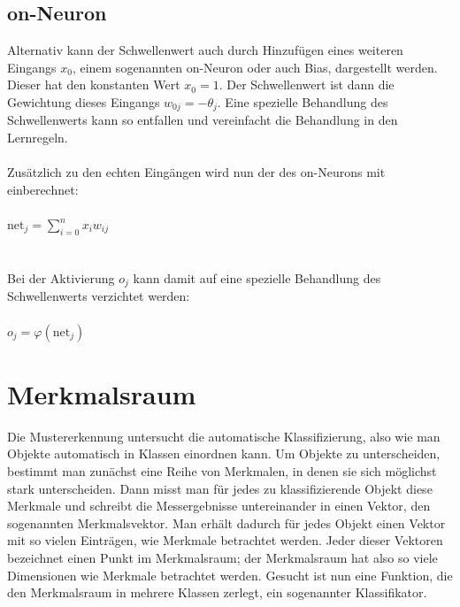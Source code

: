 \subsection{on-Neuron}
Alternativ kann der Schwellenwert auch durch Hinzufügen eines weiteren Eingangs ${\displaystyle x_{0}}$, einem sogenannten on-Neuron oder auch Bias, dargestellt werden. Dieser hat den konstanten Wert ${\displaystyle x_{0}=1}$. Der Schwellenwert ist dann die Gewichtung dieses Eingangs ${\displaystyle w_{0j}=-\theta _{j}}$. Eine spezielle Behandlung des Schwellenwerts kann so entfallen und vereinfacht die Behandlung in den Lernregeln.\\
\\
Zusätzlich zu den echten Eingängen wird nun der des on-Neurons mit einberechnet:\\
\\
${\displaystyle {\mbox{net}}_{j}=\sum _{i=0}^{n}x_{i} w_{ij}}$\\
\\
\\
Bei der Aktivierung ${\displaystyle o_{j}}$ kann damit auf eine spezielle Behandlung des Schwellenwerts verzichtet werden:\\
\\
${\displaystyle o_{j}=\varphi ({\mbox{net}}_{j})}$ 

\section{Merkmalsraum}
Die Mustererkennung untersucht die automatische Klassifizierung, also wie man Objekte automatisch in Klassen einordnen kann. Um Objekte zu unterscheiden, bestimmt man zunächst eine Reihe von Merkmalen, in denen sie sich möglichst stark unterscheiden. Dann misst man für jedes zu klassifizierende Objekt diese Merkmale und schreibt die Messergebnisse untereinander in einen Vektor, den sogenannten Merkmalsvektor. Man erhält dadurch für jedes Objekt einen Vektor mit so vielen Einträgen, wie Merkmale betrachtet werden. Jeder dieser Vektoren bezeichnet einen Punkt im Merkmalsraum; der Merkmalsraum hat also so viele Dimensionen wie Merkmale betrachtet werden. Gesucht ist nun eine Funktion, die den Merkmalsraum in mehrere Klassen zerlegt, ein sogenannter Klassifikator.

